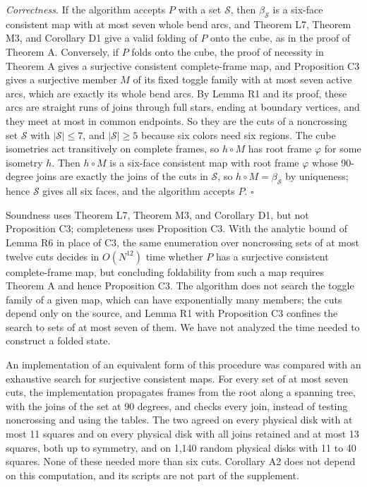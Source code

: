 \documentclass[
  11pt,
]{article}
\begin{document}
\emph{Correctness.} If the algorithm accepts \(P\) with a set
\(\mathcal S\), then \(\beta_{\mathcal S}\) is a six-face consistent map
with at most seven whole bend arcs, and Theorem L7, Theorem M3, and
Corollary D1 give a valid folding of \(P\) onto the cube, as in the
proof of Theorem A. Conversely, if \(P\) folds onto the cube, the proof
of necessity in Theorem A gives a surjective consistent complete-frame
map, and Proposition C3 gives a surjective member \(M\) of its fixed
toggle family with at most seven active arcs, which are exactly its
whole bend arcs. By Lemma R1 and its proof, these arcs are straight runs
of joins through full stars, ending at boundary vertices, and they meet
at most in common endpoints. So they are the cuts of a noncrossing set
\(\mathcal S\) with \(\left|\mathcal S\right|\le7\), and
\(\left|\mathcal S\right|\ge5\) because six colors need six regions. The
cube isometries act transitively on complete frames, so \(h\circ M\) has
root frame \(\varphi\) for some isometry \(h\). Then \(h\circ M\) is a
six-face consistent map with root frame \(\varphi\) whose 90-degree
joins are exactly the joins of the cuts in \(\mathcal S\), so
\(h\circ M=\beta_{\mathcal S}\) by uniqueness; hence \(\mathcal S\)
gives all six faces, and the algorithm accepts \(P\). \(\square\)

Soundness uses Theorem L7, Theorem M3, and Corollary D1, but not
Proposition C3; completeness uses Proposition C3. With the analytic
bound of Lemma R6 in place of C3, the same enumeration over noncrossing
sets of at most twelve cuts decides in \(O(N^{12})\) time whether \(P\)
has a surjective consistent complete-frame map, but concluding
foldability from such a map requires Theorem A and hence Proposition C3.
The algorithm does not search the toggle family of a given map, which
can have exponentially many members; the cuts depend only on the source,
and Lemma R1 with Proposition C3 confines the search to sets of at most
seven of them. We have not analyzed the time needed to construct a
folded state.

An implementation of an equivalent form of this procedure was compared
with an exhaustive search for surjective consistent maps. For every set
of at most seven cuts, the implementation propagates frames from the
root along a spanning tree, with the joins of the set at 90 degrees, and
checks every join, instead of testing noncrossing and using the tables.
The two agreed on every physical disk with at most 11 squares and on
every physical disk with all joins retained and at most 13 squares, both
up to symmetry, and on 1,140 random physical disks with 11 to 40
squares. None of these needed more than six cuts. Corollary A2 does not
depend on this computation, and its scripts are not part of the
supplement.
\end{document}
